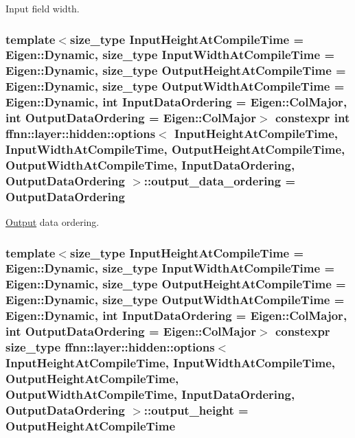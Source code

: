 Input field width. 

\hypertarget{structffnn_1_1layer_1_1hidden_1_1options_aca708d2c3dd945b311c4a00bfeb1976c}{
\subsubsection[{output\-\_\-data\-\_\-ordering}]{\setlength{\rightskip}{0pt plus 5cm}template$<$size\-\_\-type Input\-Height\-At\-Compile\-Time = Eigen\-::\-Dynamic, size\-\_\-type Input\-Width\-At\-Compile\-Time = Eigen\-::\-Dynamic, size\-\_\-type Output\-Height\-At\-Compile\-Time = Eigen\-::\-Dynamic, size\-\_\-type Output\-Width\-At\-Compile\-Time = Eigen\-::\-Dynamic, int Input\-Data\-Ordering = Eigen\-::\-Col\-Major, int Output\-Data\-Ordering = Eigen\-::\-Col\-Major$>$ constexpr int {\bf ffnn\-::layer\-::hidden\-::options}$<$ Input\-Height\-At\-Compile\-Time, Input\-Width\-At\-Compile\-Time, Output\-Height\-At\-Compile\-Time, Output\-Width\-At\-Compile\-Time, Input\-Data\-Ordering, Output\-Data\-Ordering $>$\-::output\-\_\-data\-\_\-ordering = Output\-Data\-Ordering\hspace{0.3cm}{\ttfamily [static]}}}\label{structffnn_1_1layer_1_1hidden_1_1options_aca708d2c3dd945b311c4a00bfeb1976c}


\hyperlink{classffnn_1_1layer_1_1_output}{Output} data ordering. 

\hypertarget{structffnn_1_1layer_1_1hidden_1_1options_a331b0dddbc72d13f8b490bef82fe3b16}{
\subsubsection[{output\-\_\-height}]{\setlength{\rightskip}{0pt plus 5cm}template$<$size\-\_\-type Input\-Height\-At\-Compile\-Time = Eigen\-::\-Dynamic, size\-\_\-type Input\-Width\-At\-Compile\-Time = Eigen\-::\-Dynamic, size\-\_\-type Output\-Height\-At\-Compile\-Time = Eigen\-::\-Dynamic, size\-\_\-type Output\-Width\-At\-Compile\-Time = Eigen\-::\-Dynamic, int Input\-Data\-Ordering = Eigen\-::\-Col\-Major, int Output\-Data\-Ordering = Eigen\-::\-Col\-Major$>$ constexpr {\bf size\-\_\-type} {\bf ffnn\-::layer\-::hidden\-::options}$<$ Input\-Height\-At\-Compile\-Time, Input\-Width\-At\-Compile\-Time, Output\-Height\-At\-Compile\-Time, Output\-Width\-At\-Compile\-Time, Input\-Data\-Ordering, Output\-Data\-Ordering $>$\-::output\-\_\-height = Output\-Height\-At\-Compile\-Time\hspace{0.3cm}{\ttfamily [static]}}}\label{structffnn_1_1layer_1_1hidden_1_1options_a331b0dddbc72d13f8b490bef82fe3b16}


